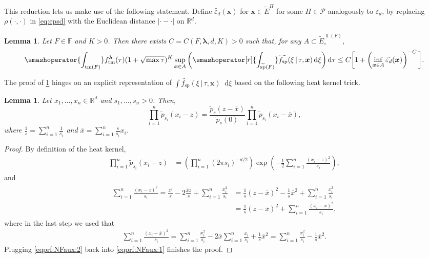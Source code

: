 \documentclass[reqno,draft]{amsart}
\numberwithin{equation}{section}
\theoremstyle{plain}
\newtheorem{lemma}[theorem]{Lemma}
\theoremstyle{remark}
\newcommand{\R}{\mathbb{R}} %
\newcommand*\diff{\mathop{}\!\mathrm{d}}
\newcommand{\fpart}{\Pi} %
\DeclareMathOperator{\lf}{lf}
\DeclareMathOperator{\dct}{tm}
\DeclareMathOperator{\dcs}{sp}
\newcommand{\rfy}[1]{\widetilde{{#1}}} %
\newcommand{\ftm}{f_\mathrm{tm}^{\boldsymbol \lambda}}
\newcommand{\fsp}{f_\mathrm{sp}}
\newcommand{\interp}{\overline{x}} %
\begin{document}
This reduction lets us make use of the following statement. Define $\rfy{\varepsilon_d}(\boldsymbol x)$ for $\boldsymbol x\in \rfy{E}^\fpart$ for some $\fpart\in \mathcal{P}$ analogously to $\varepsilon_d$, by replacing $\rho(\cdot ,\cdot )$ in \cref{eq:epsd} with the Euclidean distance $|\cdot-\cdot  |$ on $\R^d$.

\begin{lemma}\label{lem:NFRd}
    Let $F \in \mathbb{F}$ and $K > 0$. Then there exists $C = C(F,\boldsymbol \lambda,d, K) > 0$ such that, for any $A \subset \rfy{E}^{\lf(F)}_\circ $,
    \begin{equation*}%
        \smashoperator{\int_{\dct(F)}} \ftm(\tau) (1 + \sqrt{\max \tau} )^K \sup_{\boldsymbol x\in A} \bigg( \smashoperator[r]{\int_{\rfy{\dcs}(F)}} \rfy{\fsp}(\xi \,\vert\,\tau,\boldsymbol x) \diff \xi \bigg) \diff \tau
        \le C \bigg[ 1 + \left( \inf_{\boldsymbol x\in A} \rfy{\varepsilon_d}(\boldsymbol x) \right) ^{-C} \bigg] .
    \end{equation*}
\end{lemma}

The proof of \cref{lem:NFRd} hinges on an explicit representation of $\int \rfy{\fsp}(\xi \,\vert\,\tau,\boldsymbol x) \diff \xi$ based on the following heat kernel trick.
\begin{lemma}\label{lem:heatkerneltrick}
    Let $x_1, \ldots ,x_n \in \R^d$ and $s_1, \ldots ,s_n > 0$. Then, \[
        \prod_{i=1}^n \rfy{p}_{s_i}(x_i-z) = \frac{\rfy{p}_s(z-\overline{x})}{\rfy{p}_s(0)} \prod_{i=1}^n \rfy{p}_{s_i}(x_i - \interp),
    \] where $\frac{1}{s} = \sum_{i=1}^n \frac{1}{s_i}$ and $\interp = \sum_{i=1}^n \frac{s}{s_i}x_i$.
\end{lemma}
\begin{proof}
    By definition of the heat kernel,
    \begin{align}\label{eqprf:NFaux:1}
        \prod_{i=1}^n \rfy{p}_{s_i}(x_i-z)
        &= \left(\prod_{i=1}^n (2\pi s_i)^{-d / 2}\right) \exp \left( -\frac{1}{2} \sum_{i=1}^n \frac{(x_i-z)^2}{s_i} \right) ,
    \end{align}
    and
    \begin{align}\begin{split}\label{eqprf:NFaux:2}
        \sum_{i=1}^n \frac{(x_i-z)^2}{s_i}
        = \frac{z^2}{s} -2 \frac{\interp z}{s}+ \sum_{i=1}^n \frac{x_i^2}{s_i}
        &= \frac{1}{s}(z-\interp)^2 -\frac{1}{s}\interp^2 + \sum_{i=1}^n \frac{x_i^2}{s_i}\\
        &= \frac{1}{s}(z-\interp)^2 + \sum_{i=1}^n \frac{(x_i-\interp)^2}{s_i},
    \end{split}\end{align}
    where in the last step we used that
    \begin{align*}
        \sum_{i=1}^n \frac{(x_i-\interp)^2}{s_i} = \sum_{i=1}^n \frac{x_i^2}{s_i} - 2 \interp \sum_{i=1}^n \frac{x_i}{s_i} + \frac{1}{s} \interp^2 = \sum_{i=1}^n \frac{x_i^2}{s_i} - \frac{1}{s}\interp^2.
    \end{align*}
    Plugging \cref{eqprf:NFaux:2} back into \cref{eqprf:NFaux:1} finishes the proof.
\end{proof}
\end{document}
